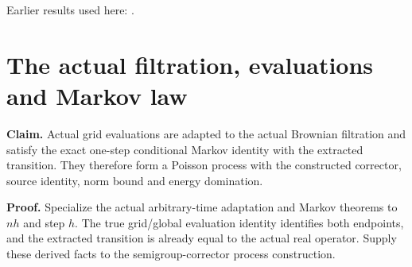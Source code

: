 \documentclass[11pt,a4paper]{article}
\begin{document}
Earlier results used here: \cite[Section~3.26.3]{LangevinLean2026ULASC}.

\section{\texorpdfstring{The actual filtration, evaluations and Markov law}{The actual filtration, evaluations and Markov law}}


\textbf{Claim.} Actual grid evaluations are adapted to the actual Brownian filtration and satisfy the exact one-step conditional Markov identity with the extracted transition. They therefore form a Poisson process with the constructed corrector, source identity, norm bound and energy domination.



\textbf{Proof.} Specialize the actual arbitrary-time adaptation and Markov theorems to \(nh\) and step \(h\). The true grid/\allowbreak{}global evaluation identity identifies both endpoints, and the extracted transition is already equal to the actual real operator. Supply these derived facts to the semigroup-corrector process construction.
\end{document}
